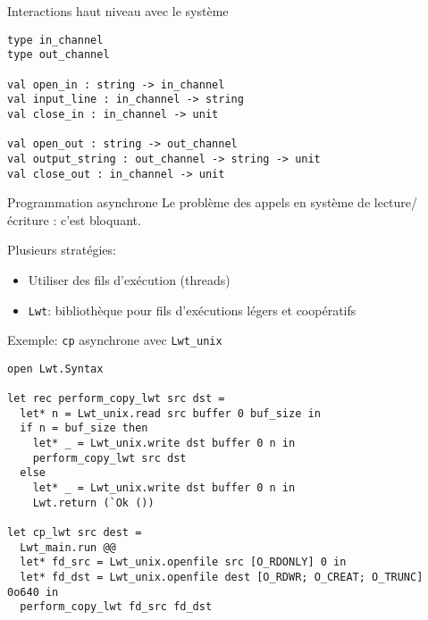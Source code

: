 
\begin{frame}[fragile]{Interactions haut niveau avec le système}
 

\begin{lstlisting}
type in_channel
type out_channel

val open_in : string -> in_channel
val input_line : in_channel -> string
val close_in : in_channel -> unit

val open_out : string -> out_channel
val output_string : out_channel -> string -> unit
val close_out : in_channel -> unit

\end{lstlisting}
    
\end{frame}

\begin{frame}{Programmation asynchrone}
Le problème des appels en système de lecture/écriture : c'est bloquant.
 
Plusieurs stratégies:
\begin{itemize}[label=\small{}]
    \item Utiliser des fils d'exécution (threads)
    \item \texttt{Lwt}: bibliothèque pour fils d'exécutions légers et coopératifs
\end{itemize}
\end{frame}

\begin{frame}[fragile]{Exemple: \texttt{cp} asynchrone avec \texttt{Lwt\_unix}}

\begin{lstlisting}
open Lwt.Syntax

let rec perform_copy_lwt src dst =
  let* n = Lwt_unix.read src buffer 0 buf_size in
  if n = buf_size then
    let* _ = Lwt_unix.write dst buffer 0 n in
    perform_copy_lwt src dst
  else
    let* _ = Lwt_unix.write dst buffer 0 n in
    Lwt.return (`Ok ())

let cp_lwt src dest =
  Lwt_main.run @@
  let* fd_src = Lwt_unix.openfile src [O_RDONLY] 0 in 
  let* fd_dst = Lwt_unix.openfile dest [O_RDWR; O_CREAT; O_TRUNC] 0o640 in
  perform_copy_lwt fd_src fd_dst
\end{lstlisting}
    
\end{frame}